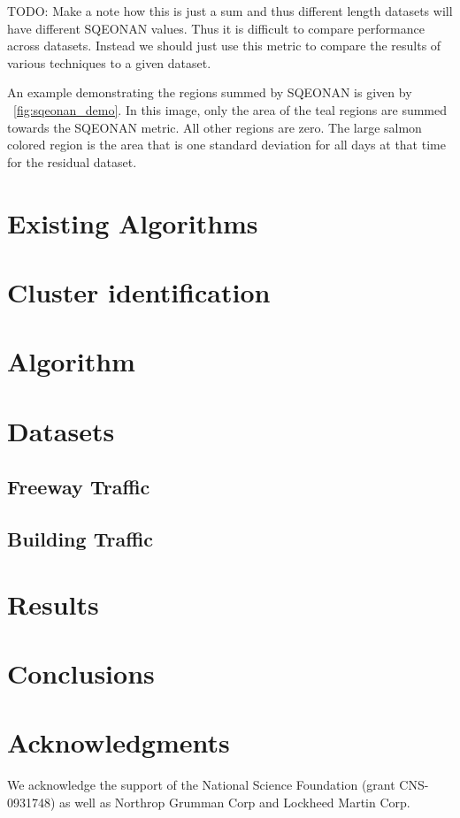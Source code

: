 \documentclass{sig-alternate}
\begin{document}
TODO:
Make a note how this is just a sum and thus different length datasets will have different SQEONAN values.  Thus it is difficult to compare performance across datasets.  Instead we should just use this metric to compare the results of various techniques to a given dataset.

An example demonstrating the regions summed by SQEONAN is given by ~\ref{fig:sqeonan_demo}.  In this image, only the area of the teal regions are summed towards the SQEONAN metric.  All other regions are zero.  The large salmon colored region is the area that is one standard deviation for all days at that time for the residual dataset.

\section{Existing Algorithms}
\section{Cluster identification}
\section{Algorithm}

\section{Datasets}
\subsection{Freeway Traffic}
\subsection{Building Traffic}

\section{Results}




\section{Conclusions}

\section{Acknowledgments}
We acknowledge the support of the National Science Foundation (grant CNS-0931748) as well as Northrop Grumman Corp and Lockheed Martin Corp.

%

%
%
\appendix
\end{document}
